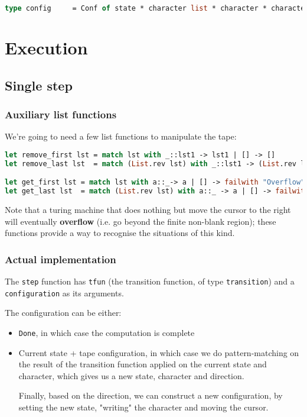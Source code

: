\documentclass[a4paper,10pt]{article}
\begin{document}
\begin{lstlisting}[language = ml]
type config     = Conf of state * character list * character * character list | Done
\end{lstlisting}

\section{Execution}
\subsection{Single step}
\subsubsection{Auxiliary list functions}
We're going to need a few list functions to manipulate the tape:
\begin{lstlisting}[language = ml]
let remove_first lst = match lst with _::lst1 -> lst1 | [] -> []
let remove_last lst  = match (List.rev lst) with _::lst1 -> (List.rev lst1) | [] -> []

let get_first lst = match lst with a::_-> a | [] -> failwith "Overflow"
let get_last lst  = match (List.rev lst) with a::_ -> a | [] -> failwith "Underflow"
\end{lstlisting}

Note that a turing machine that does nothing but move the cursor to the right will eventually \textbf{overflow} (i.e. go beyond the finite non-blank region); these functions provide a way to recognise the situations of this kind.

\subsubsection{Actual implementation}
The \texttt{step} function has \texttt{tfun} (the transition function, of type \texttt{transition}) and a \texttt{configuration} as its arguments.\smallskip

The configuration can be either:
\begin{itemize}
    \item \texttt{Done}, in which case the computation is complete
    \item Current state + tape configuration, in which case we do pattern-matching on the result of the transition function applied on the current state and character, which gives us a new state, character and direction. \smallskip
    
    Finally, based on the direction, we can construct a new configuration, by setting the new state, "writing" the character and moving the cursor. 
\end{itemize}
\end{document}
